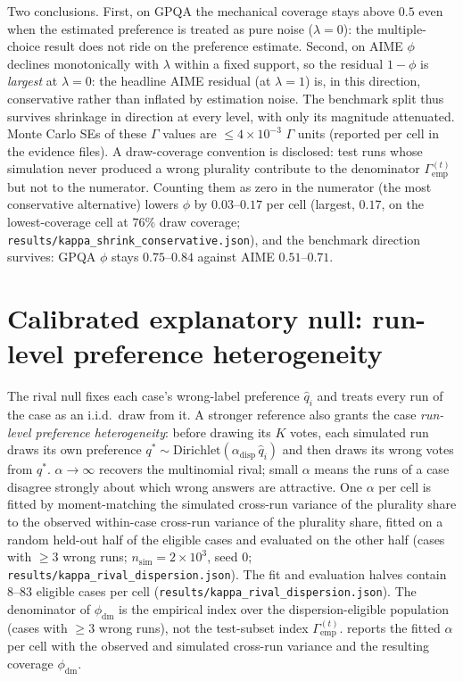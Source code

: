 \documentclass[a4paper,fleqn]{cas-sc}
\newcommand{\agreementIndex}{\Gamma}
\begin{document}
Two conclusions. First, on GPQA the mechanical coverage stays above $0.5$ even when the estimated preference is treated as pure noise
($\lambda=0$): the multiple-choice result does not ride on the
preference estimate. Second, on AIME $\phi$ declines monotonically with
$\lambda$ within a fixed support, so the residual $1-\phi$ is
\emph{largest} at $\lambda=0$: the headline AIME residual (at
$\lambda=1$) is, in this direction, conservative rather than inflated
by estimation noise. The benchmark split thus survives shrinkage in
direction at every level, with only its magnitude attenuated. Monte
Carlo SEs of these $\agreementIndex$ values are $\le4\times10^{-3}$ $\agreementIndex$ units (reported per cell in the evidence files). A draw-coverage convention is disclosed: test runs whose simulation never produced a wrong plurality contribute to the denominator $\agreementIndex_{\mathrm{emp}}^{(t)}$ but not to the numerator. Counting them as zero in the numerator (the most conservative alternative) lowers $\phi$ by $0.03$--$0.17$ per cell (largest, $0.17$, on the
lowest-coverage cell at $76\%$ draw coverage;
\texttt{results/kappa\_shrink\_conservative.json}), and the benchmark
direction survives: GPQA $\phi$ stays $0.75$--$0.84$ against AIME
$0.51$--$0.71$.

\section{Calibrated explanatory null: run-level preference heterogeneity}
\label{app:dispersion}

The rival null fixes each case's wrong-label preference $\hat q_i$ and
treats every run of the case as an i.i.d.\ draw from it. A stronger
reference also grants the case \emph{run-level preference
heterogeneity}: before drawing its $K$ votes, each simulated run draws
its own preference $q^*\sim\mathrm{Dirichlet}(\alpha_{\mathrm{disp}}\,\hat q_i)$ and
then draws its wrong votes from $q^*$. $\alpha\to\infty$ recovers the
multinomial rival; small $\alpha$ means the runs of a case disagree
strongly about which wrong answers are attractive. One $\alpha$ per cell is fitted by moment-matching the simulated cross-run variance of the
plurality share to the observed within-case cross-run variance of the
plurality share, fitted on a random held-out half of the eligible cases and evaluated on the other half (cases with $\ge3$ wrong runs;
$n_{\mathrm{sim}}=2\times10^3$, seed 0;
\texttt{results/kappa\_rival\_dispersion.json}). The fit and
evaluation halves contain $8$--$83$ eligible cases per cell
(\texttt{results/kappa\_rival\_dispersion.json}). The denominator of
$\phi_{\mathrm{dm}}$ is the empirical index over the
dispersion-eligible population (cases with $\ge3$ wrong runs), not the
test-subset index $\agreementIndex_{\mathrm{emp}}^{(t)}$. 
reports the fitted $\alpha$ per cell with the observed and simulated
cross-run variance and the resulting coverage $\phi_{\mathrm{dm}}$.
\end{document}
